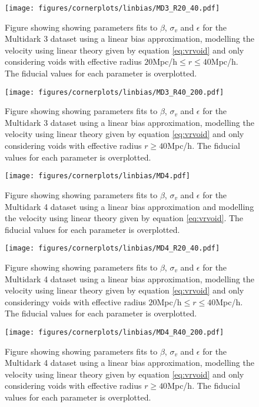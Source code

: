 \begin{figure}[H]
    \texttt{[image: figures/cornerplots/linbias/MD3\_R20\_40.pdf]}
    \caption{Figure showing showing parameters fits to $\beta$, $\sigma_v$ and $\epsilon$ for the Multidark 3 dataset using a linear bias approximation, modelling the velocity using linear theory given by equation \ref{eq:vrvoid} and only considering voids with effective radius $20$Mpc/h$\leq r \leq 40$Mpc/h. The fiducial values for each parameter is overplotted.}
    \label{fig:linbiasMD3R2040}
\end{figure}

\begin{figure}[H]
    \texttt{[image: figures/cornerplots/linbias/MD3\_R40\_200.pdf]}
    \caption{Figure showing showing parameters fits to $\beta$, $\sigma_v$ and $\epsilon$ for the Multidark 3 dataset using a linear bias approximation, modelling the velocity using linear theory given by equation \ref{eq:vrvoid} and only considering voids with effective radius $r\geq 40$Mpc/h. The fiducial values for each parameter is overplotted.}
    \label{fig:linbiasMD3R40}
\end{figure}

\begin{figure}[H]
    \texttt{[image: figures/cornerplots/linbias/MD4.pdf]}
    \caption{Figure showing showing parameters fits to $\beta$, $\sigma_v$ and $\epsilon$ for the Multidark 4 dataset using a linear bias approximation and  modelling the velocity using linear theory given by equation \ref{eq:vrvoid}.
    The fiducial values for each parameter is overplotted.}
    \label{fig:linbiasMD4}
\end{figure}

\begin{figure}[H]
    \texttt{[image: figures/cornerplots/linbias/MD4\_R20\_40.pdf]}
    \caption{Figure showing showing parameters fits to $\beta$, $\sigma_v$ and $\epsilon$ for the Multidark 4 dataset using a linear bias approximation, modelling the velocity using linear theory given by equation \ref{eq:vrvoid} and only consideringy voids with effective radius $20$Mpc/h$\leq r \leq 40$Mpc/h. The fiducial values for each parameter is overplotted.}
    \label{fig:linbiasMD4R2040}
\end{figure}

\begin{figure}[H]
    \texttt{[image: figures/cornerplots/linbias/MD4\_R40\_200.pdf]}
    \caption{Figure showing showing parameters fits to $\beta$, $\sigma_v$ and $\epsilon$ for the Multidark 4 dataset using a linear bias approximation, modelling the velocity using linear theory given by equation \ref{eq:vrvoid} and only considering voids with effective radius $r\geq 40$Mpc/h. The fiducial values for each parameter is overplotted.}
    \label{fig:linbiasMD4R40}
\end{figure}
